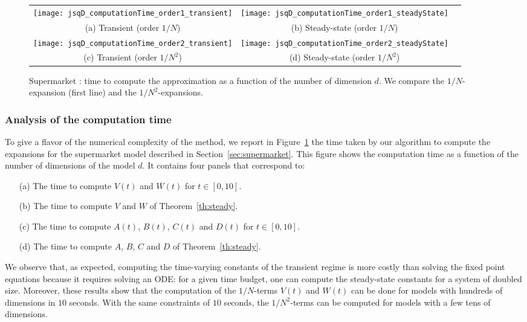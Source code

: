 \documentclass[sigconf]{acmart}
\begin{document}
\begin{figure}[ht]
  \centering
  \begin{tabular}{@{}c@{}c@{}c@{}}
    \texttt{[image: jsqD\_computationTime\_order1\_transient]}
    &\texttt{[image: jsqD\_computationTime\_order1\_steadyState]}\\
    (a) Transient (order $1/N$) & (b) Steady-state (order $1/N$)\\
    \texttt{[image: jsqD\_computationTime\_order2\_transient]}
    &\texttt{[image: jsqD\_computationTime\_order2\_steadyState]}\\
    (c) Transient (order $1/N^2$) & (d) Steady-state (order $1/N^2$)
  \end{tabular}
  \caption{Supermarket : time to compute the approximation as a
    function of the number of dimension $d$. We compare the
    $1/N$-expansion (first line) and the $1/N^2$-expansions. }
  \label{fig:computationTime}
\end{figure}

  
\subsubsection{Analysis of the computation time}


  To give a flavor of the numerical complexity of the method, we report
in Figure~\ref{fig:computationTime} the time taken by our algorithm to
compute the expansions for the supermarket model described in
Section~\ref{sec:supermarket}. This figure shows the computation time
as a function of the number of dimensions of the model $d$. It contains
four panels that correspond to: 
\begin{itemize}
\item[(a)] The time to compute $V(t)$ and $W(t)$ for $t\in[0,10]$.
\item[(b)] The time to compute $V$ and $W$ of
  Theorem~\ref{th:steady}.
\item[(c)] The time to compute $A(t)$, $B(t)$, $C(t)$ and $D(t)$ for
  $t\in[0,10]$. 
\item[(d)] The time to compute $A$, $B$, $C$ and $D$ of
  Theorem~\ref{th:steady}. 
\end{itemize}
We observe that, as expected, computing the time-varying constants of
the transient regime is more costly than solving the fixed point
equations because it requires solving an ODE: for a given time
budget, one can compute the steady-state constants for a system of
doubled size.  Moreover, these results show that the computation of
the $1/N$-terms $V(t)$ and $W(t)$ can be done for models with hundreds
of dimensions in $10$ seconds. With the same constraints of $10$
seconds, the $1/N^2$-terms can be computed for models with a few tens
of dimensions.
\end{document}

